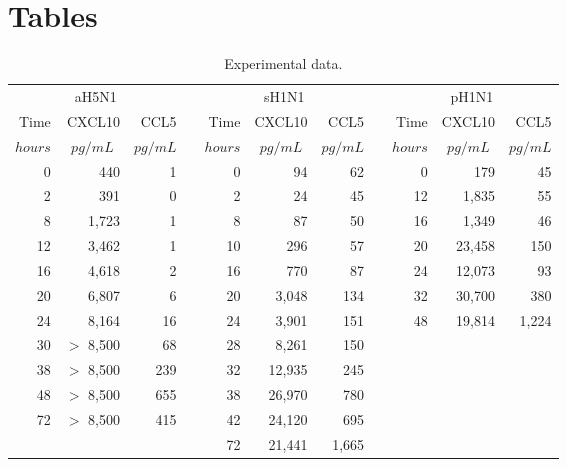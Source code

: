 \documentclass[10pt]{article}
\begin{document}
\pagebreak

\section*{Tables}



\renewcommand{\thetable}{S\arabic{table}}

\begin{table}
\begin{center}
\begin{tabular}{| r r r | c | r r r | c | r r r |}
  \multicolumn{3}{c}{aH5N1} & \multicolumn{1}{c}{} & \multicolumn{3}{c}{sH1N1} & \multicolumn{1}{c}{} & \multicolumn{3}{c}{pH1N1}\\
  \cline{1-3} \cline{5-7} \cline{9-11}
  Time & CXCL10 & CCL5 & & Time & CXCL10 & CCL5 & & Time & CXCL10 & CCL5 \\
   \multicolumn{1}{|c}{\footnotesize{$hours$}} & \multicolumn{1}{c}{\footnotesize{$pg/mL$}} & \multicolumn{1}{c|}{\footnotesize{$pg/mL$}} & & \multicolumn{1}{c}{\footnotesize{$hours$}} & \multicolumn{1}{c}{\footnotesize{$pg/mL$}} & \multicolumn{1}{c|}{\footnotesize{$pg/mL$}} & & \multicolumn{1}{c}{\footnotesize{$hours$}} & \multicolumn{1}{c}{\footnotesize{$pg/mL$}} & \multicolumn{1}{c|}{\footnotesize{$pg/mL$}}\\
  \cline{1-3} \cline{5-7} \cline{9-11}
  0 & 440 & 1 & & 0 & 94 & 62 & & 0 & 179 & 45  \\
  2 & 391 & 0 & & 2 & 24 & 45 & & 12 & 1,835 & 55 \\
  8 & 1,723 & 1 & & 8 & 87 & 50 & & 16 & 1,349 & 46 \\
  12 & 3,462 & 1 & & 10 & 296 & 57 & & 20 & 23,458 & 150 \\
  16 & 4,618 & 2 & & 16 & 770 & 87 & & 24 & 12,073 & 93 \\
  20 & 6,807 & 6 & & 20 & 3,048 & 134 & & 32 & 30,700 & 380 \\
  24 & 8,164 & 16 & & 24 & 3,901 & 151 & & 48 & 19,814 & 1,224  \\
  30 & $>$ 8,500 & 68 & & 28 & 8,261 & 150 &  &  &  &  \\
  38 & $>$ 8,500 & 239 & & 32 & 12,935 & 245 &  &  &  &  \\
  48 & $>$ 8,500 & 655 & & 38 & 26,970 & 780 &  &  &  &  \\
  72 & $>$ 8,500 & 415 & & 42 & 24,120 & 695 &  &  &  &  \\
  & & & & 72 & 21,441 & 1,665 &  &  &  &  \\
    \cline{1-3} \cline{5-7} \cline{9-11}
\end{tabular}
\caption{Experimental data. }
\label{tab:data}
\end{center}
\end{table}
\end{document}
